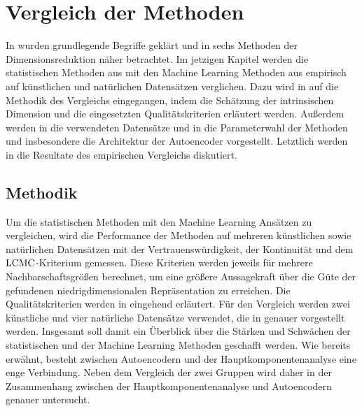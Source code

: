 \chapter{Vergleich der Methoden}
\label{ch:Vergleich}

In  wurden grundlegende Begriffe geklärt und in
 sechs Methoden der Dimensionsreduktion näher betrachtet. Im jetzigen
Kapitel werden die statistischen Methoden aus  mit den
Machine Learning Methoden aus  empirisch auf künstlichen und
natürlichen Datensätzen verglichen. Dazu wird in  auf die
Methodik des Vergleichs eingegangen, indem die Schätzung der intrinsischen Dimension und die
eingesetzten Qualitätskriterien erläutert werden. Außerdem werden in
 die verwendeten Datensätze und in
 die Parameterwahl der Methoden und
insbesondere die Architektur der Autoencoder vorgestellt. Letztlich werden in
 die Resultate des empirischen Vergleichs diskutiert.

\section{Methodik}
\label{ch:Vergleich:sec:Methodik}

Um die statistischen Methoden mit den Machine Learning Ansätzen zu vergleichen, wird die
Performance der Methoden auf mehreren künstlichen sowie natürlichen Datensätzen mit der
Vertrauenswürdigkeit, der Kontinuität und dem $\operatorname{LCMC}$-Kriterium gemessen. Diese Kriterien werden
jeweils für mehrere Nachbarschaftsgrößen berechnet, um eine größere Aussagekraft über die Güte der
gefundenen niedrigdimensionalen Repräsentation zu erreichen. Die Qualitätskriterien werden in
 eingehend erläutert. Für den
Vergleich werden zwei künstliche und vier natürliche Datensätze verwendet, die in
 genauer vorgestellt werden. Insgesamt soll damit
ein Überblick über die Stärken und Schwächen der statistischen und der Machine Learning Methoden
geschafft werden. Wie bereits erwähnt, besteht zwischen Autoencodern und der
Hauptkomponentenanalyse eine enge Verbindung. Neben dem Vergleich der zwei Gruppen wird daher in
 der Zusammenhang zwischen der Hauptkomponentenanalyse
und Autoencodern genauer untersucht.

